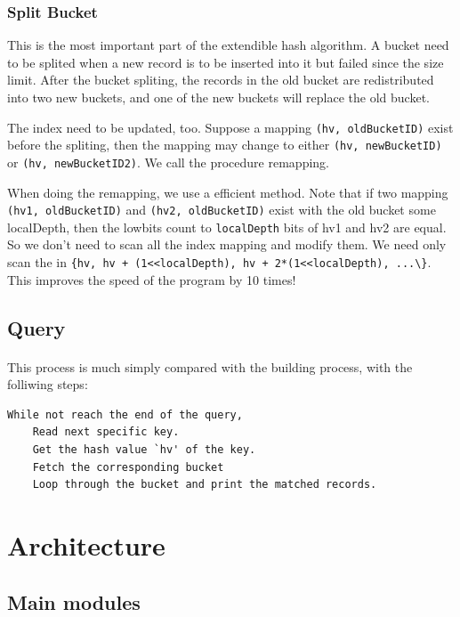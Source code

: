 \documentclass[a4paper, 12pt]{article}
\begin{document}
    \subsubsection{Split Bucket}
        This is the most important part of the extendible hash algorithm. A bucket need to be splited when a new record is to be inserted into it but failed since the size limit. After the bucket spliting, the records in the old bucket are redistributed into two new buckets, and one of the new buckets will replace the old bucket. 

        The index need to be updated, too. Suppose a mapping \verb|(hv, oldBucketID)| exist before the spliting, then the mapping may change to either \verb|(hv, newBucketID)| or \verb|(hv, newBucketID2)|. We call the procedure remapping.

        When doing the remapping, we use a efficient method. Note that if two mapping \verb|(hv1, oldBucketID)| and \verb|(hv2, oldBucketID)| exist with the old bucket some localDepth, then the lowbits count to \verb|localDepth| bits of hv1 and hv2 are equal. So we don't need to scan all the index mapping and modify them. We need only scan the in \verb|{hv, hv + (1<<localDepth), hv + 2*(1<<localDepth), ...\}|. This improves the speed of the program by 10 times!
    \subsection{Query}
        \paragraph{}
            This process is much simply compared with the building process, with the folliwing steps:
\begin{verbatim}
While not reach the end of the query,
    Read next specific key.
    Get the hash value `hv' of the key.
    Fetch the corresponding bucket
    Loop through the bucket and print the matched records.
\end{verbatim}
\section{Architecture}
    \subsection{Main modules}
\end{document}
